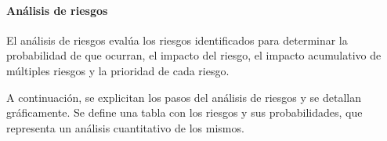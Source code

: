 \begin{comment}
        \item Detección de nuevos requerimientos / mala interpretación de requerimientos
        \item Pérdida de datos por fallas en seguridad o errores por parte de los integrantes.
        \item Errores de diseño
        \item Subestimación de la complejidad (Fallar en los deadlines y en los costos. Perder credibilidad)
        \item Falta de claridad en roles y responsabilidades
        \item Falta de recursos para capacitación %
	\end{enumerate}
    
    Posible riesgo, una vez implementado la probabilidad de que se filtro información sensible de una persona.
    
\end{comment}


\paragraph{Análisis de riesgos}

El análisis de riesgos evalúa los riesgos identificados para determinar la probabilidad de que ocurran, el impacto del riesgo, el impacto acumulativo de múltiples riesgos y la prioridad de cada riesgo.

A continuación, se explicitan los pasos del análisis de riesgos y se detallan gráficamente.
Se define una tabla con los riesgos y sus probabilidades, que representa un análisis cuantitativo de los mismos.

